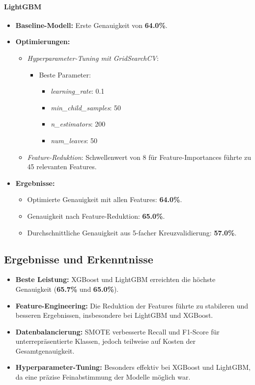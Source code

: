 \documentclass[a4paper,12pt]{article}
\begin{document}
\paragraph{LightGBM}
\begin{itemize}
    \item \textbf{Baseline-Modell:} Erste Genauigkeit von \textbf{64.0\%}.
    \item \textbf{Optimierungen:}
    \begin{itemize}
        \item \textit{Hyperparameter-Tuning mit GridSearchCV}: 
        \begin{itemize}
            \item Beste Parameter:
            \begin{itemize}
                \item \textit{learning\_rate}: 0.1
                \item \textit{min\_child\_samples}: 50
                \item \textit{n\_estimators}: 200
                \item \textit{num\_leaves}: 50
            \end{itemize}
        \end{itemize}
        \item \textit{Feature-Reduktion}: Schwellenwert von 8 für Feature-Importances führte zu 45 relevanten Features.
    \end{itemize}
    \newpage
    \item \textbf{Ergebnisse:}
    \begin{itemize}
        \item Optimierte Genauigkeit mit allen Features: \textbf{64.0\%}.
        \item Genauigkeit nach Feature-Reduktion: \textbf{65.0\%}.
        \item Durchschnittliche Genauigkeit aus 5-facher Kreuzvalidierung: \textbf{57.0\%}.
    \end{itemize}
\end{itemize}


\subsection{Ergebnisse und Erkenntnisse}
\begin{itemize}
    \item \textbf{Beste Leistung:} XGBoost und LightGBM erreichten die höchste Genauigkeit (\textbf{65.7\%} und \textbf{65.0\%}).
    \item \textbf{Feature-Engineering:} Die Reduktion der Features führte zu stabileren und besseren Ergebnissen, insbesondere bei LightGBM und XGBoost.
    \item \textbf{Datenbalancierung:} SMOTE verbesserte Recall und F1-Score für unterrepräsentierte Klassen, jedoch teilweise auf Kosten der Gesamtgenauigkeit.
    \item \textbf{Hyperparameter-Tuning:} Besonders effektiv bei XGBoost und LightGBM, da eine präzise Feinabstimmung der Modelle möglich war.
\end{itemize}
\end{document}
